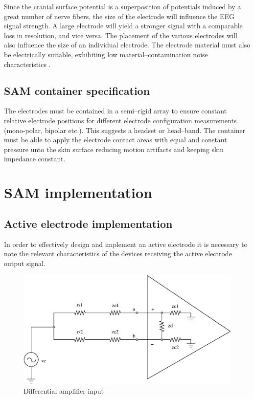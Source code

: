 Since the cranial surface potential is a superposition of potentials
induced by a great number of nerve fibers, the size of the electrode
will influence the EEG signal strength. A large electrode will yield a
stronger signal with a comparable loss in resolution, and vice
versa. The placement of the various electrodes will also influence the
size of an individual electrode. The electrode material must also be
electrically suitable, exhibiting low material--contamination noise
characteristics \cite{electrode-stability}.

\subsection{SAM container specification}
The electrodes must be contained in a semi--rigid array to ensure
constant relative electrode positions for different electrode
configuration measurements (mono-polar, bipolar etc.). This suggests a
headset or head--band. The container must be able to apply the
electrode contact areas with equal and constant pressure unto the skin
surface reducing motion artifacts and keeping skin impedance constant.

\section{SAM  implementation}
\subsection{Active electrode implementation}
\label{section:ae-imp}
In order to effectively design and implement an active electrode it is
necessary to note the relevant characteristics of the devices
receiving the active electrode output signal.

\begin{figure}[htbp]
	\begin{center}
	\psfrag{+}{+}
	\psfrag{-}{--}
	\includegraphics[width=\textwidth]{diff-amp-frontend.eps}
	\caption{ Differential amplifier input}
	\label{fig:diff-amp-frontend}
	\end{center}
\end{figure}

